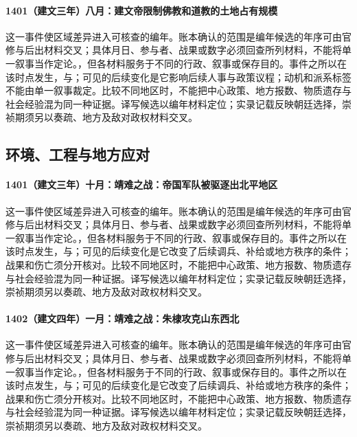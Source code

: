 \paragraph{1401（建文三年）八月：建文帝限制佛教和道教的土地占有规模} 这一事件使区域差异进入可核查的编年。账本确认的范围是编年候选的年序可由官修与后出材料交叉；具体月日、参与者、战果或数字必须回查所列材料，不能将单一叙事当作定论。，但各材料服务于不同的行政、叙事或保存目的。事件之所以在该时点发生，与；可见的后续变化是它影响后续人事与政策议程；动机和派系标签不能由单一叙事裁定。比较不同地区时，不能把中心政策、地方报数、物质遗存与社会经验混为同一种证据。译写候选以编年材料定位；实录记载反映朝廷选择，崇祯期须另以奏疏、地方及敌对政权材料交叉。

\subsection{环境、工程与地方应对}

\paragraph{1401（建文三年）十月：靖难之战：帝国军队被驱逐出北平地区} 这一事件使区域差异进入可核查的编年。账本确认的范围是编年候选的年序可由官修与后出材料交叉；具体月日、参与者、战果或数字必须回查所列材料，不能将单一叙事当作定论。，但各材料服务于不同的行政、叙事或保存目的。事件之所以在该时点发生，与；可见的后续变化是它改变了后续调兵、补给或地方秩序的条件；战果和伤亡须分开核对。比较不同地区时，不能把中心政策、地方报数、物质遗存与社会经验混为同一种证据。译写候选以编年材料定位；实录记载反映朝廷选择，崇祯期须另以奏疏、地方及敌对政权材料交叉。

\paragraph{1402（建文四年）一月：靖难之战：朱棣攻克山东西北} 这一事件使区域差异进入可核查的编年。账本确认的范围是编年候选的年序可由官修与后出材料交叉；具体月日、参与者、战果或数字必须回查所列材料，不能将单一叙事当作定论。，但各材料服务于不同的行政、叙事或保存目的。事件之所以在该时点发生，与；可见的后续变化是它改变了后续调兵、补给或地方秩序的条件；战果和伤亡须分开核对。比较不同地区时，不能把中心政策、地方报数、物质遗存与社会经验混为同一种证据。译写候选以编年材料定位；实录记载反映朝廷选择，崇祯期须另以奏疏、地方及敌对政权材料交叉。

